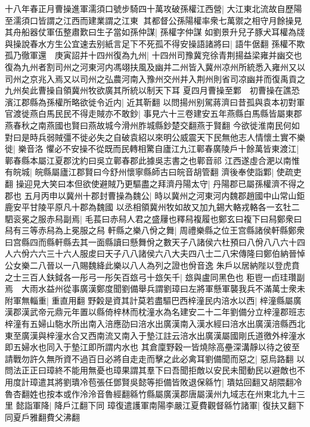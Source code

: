 十八年春正月曹操進軍濡須口號步騎四十萬攻破孫權江西營|{
	大江東北流故自歷陽至濡須口皆謂之江西而建業謂之江東}
其都督公孫陽權率衆七萬禦之相守月餘操見其舟船器仗軍伍整肅歎曰生子當如孫仲謀|{
	孫權字仲謀}
如劉景升兒子豚犬耳權為牋與操說春水方生公宜速去别紙言足下不死孤不得安操語諸將曰|{
	語牛倨翻}
孫權不欺孤乃徹軍還　庚寅詔并十四州復為九州|{
	十四州司豫冀兖徐青荆揚益梁雍并幽交也復為九州者割司州之河東河内馮翊扶風及幽并二州皆入冀州凉州所統悉入雍州又以司州之京兆入焉又以司州之弘農河南入豫州交州并入荆州則省司凉幽并而復禹貢之九州矣此曹操自領冀州牧欲廣其所統以制天下耳}
夏四月曹操至鄴　初曹操在譙恐濱江郡縣為孫權所略欲徙令近内|{
	近其靳翻}
以問揚州别駕蔣濟曰昔孤與袁本初對軍官渡徙燕白馬民民不得走賊亦不敢鈔|{
	事見六十三卷建安五年燕縣白馬縣皆屬東郡燕春秋之南燕國也賢曰燕故城今滑州胙城縣鈔楚交翻燕于賢翻}
今欲徙淮南民何如對曰是時兵弱賊彊不徙必失之自破袁紹以來明公威震天下民無他志人情懷土實不樂徙|{
	樂音洛}
懼必不安操不從既而民轉相驚自廬江九江鄿春廣陵戶十餘萬皆東渡江|{
	鄿春縣本屬江夏郡沈約曰吳立鄿春郡此據吳志書之也鄿音祁}
江西遂虛合淝以南惟有皖城|{
	皖縣屬廬江郡賢曰今舒州懷寧縣師古曰皖音胡管翻}
濟後奉使詣鄴|{
	使疏吏翻}
操迎見大笑曰本但欲使避賊乃更驅盡之拜濟丹陽太守|{
	丹陽郡已屬孫權濟不得之郡也}
五月丙申以冀州十郡封曹操為魏公|{
	時以冀州之河東河内魏郡趙國中山常山鉅鹿安平甘陵平原凡十郡為魏國}
以丞相領冀州牧如故又加九錫大輅戎輅各一玄牡二駟衮冕之服赤舄副焉|{
	毛萇曰赤舄人君之盛屨也釋舄複履也鄭玄曰複下曰舄鄭衆曰舄有三等赤舄為上冕服之舄}
軒縣之樂八佾之舞|{
	周禮樂縣之位王宫縣諸侯軒縣鄭衆曰宫縣四而縣軒縣去其一面縣讀曰懸舞佾之數天子八諸侯六杜預曰八佾八八六十四人六佾六六三十六人服䖍曰天子八八諸侯六八大夫四八士二八宋傳隆曰鄭伯納晉悼公女樂二八晉以一八賜魏絳此樂以八人為列之證也佾音逸}
朱戶以居納陛以登虎賁之士三百人鈇鉞各一彤弓一彤矢百玈弓十玈矢千|{
	玈與盧同黑色也}
秬鬯一卣珪瓚副焉　大雨水益州從事廣漢鄭度聞劉備舉兵謂劉璋曰左將軍懸軍襲我兵不滿萬士衆未附軍無輜重|{
	重直用翻}
野糓是資其計莫若盡驅巴西梓潼民内涪水以西|{
	梓潼縣屬廣漢郡漢武帝元鼎元年置以縣倚梓林而枕潼水為名建安二十二年劉備分立梓潼郡班志梓潼有五婦山駞水所出南入涪應劭曰涪水出廣漢南入漢水經曰涪水出廣漢涪縣西北東至廣漢與梓潼水合又西南流又南入于墊江註云涪水出廣漢屬國剛氏道徼外梓潼水即五婦水也同入于墊江即所謂内水也}
其倉廩野穀一皆燒除高壘深溝靜以待之彼至請戰勿許久無所資不過百日必將自走走而擊之此必禽耳劉備聞而惡之|{
	惡烏路翻}
以問法正正曰璋終不能用無憂也璋果謂其羣下曰吾聞拒敵以安民未聞動民以避敵也不用度計璋遣其將劉璝冷苞張任鄧賢吳懿等拒備皆敗退保緜竹|{
	璝姑回翻又胡隈翻冷魯杏翻姓也按本或作泠泠音魯經翻緜竹縣屬廣漢郡唐屬漢州九域志在州東北九十三里}
懿詣軍降|{
	降戶江翻下同}
璋復遣護軍南陽李嚴江夏費觀督緜竹諸軍|{
	復扶又翻下同夏戶雅翻費父沸翻}
